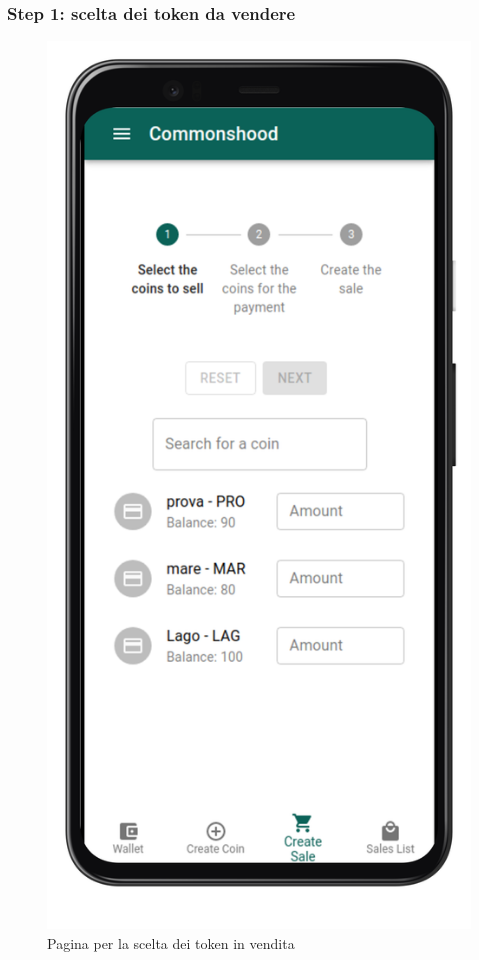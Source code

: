 \documentclass[a4paper]{article}
\begin{document}
        \subsubsection{Step 1: scelta dei token da vendere}
        \begin{figure}[H]
          \includegraphics[scale=0.16]{coinsToSell.png}
          \centering
          \caption{Pagina per la scelta dei token in vendita}
          \centering
          \label{fig:selectCoinsToSell}
        \end{figure}
\end{document}
